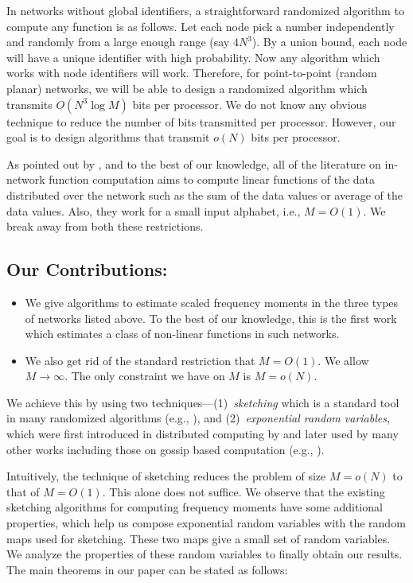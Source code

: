 \documentclass[10pt,twosided,a4paper,draft,onecolumn]{article}
\begin{document}
In networks without global identifiers, a straightforward randomized
algorithm to compute any function is as follows. Let each node pick a
number independently and randomly from a large enough range (say
$4N^3$). By a union bound, each node will have a unique identifier
with high probability. Now any algorithm which works with node
identifiers will work. Therefore, for point-to-point (random planar)
networks, we will be able to design a randomized algorithm which
transmits $O(N^3 \log M)$ bits per processor. We do not know any obvious
technique to reduce the number of bits transmitted per
processor. However, our goal is to design algorithms that transmit $o(N)$ bits per processor. 

As pointed out by \cite{Giridhar06}, and to the best of our knowledge,
all of the literature on in-network function computation aims to
compute linear functions of the data distributed over the network such as the
sum of the data values or average of the data values. Also, they work
for a small input alphabet, i.e., $M=O(1)$. We break away from both
these restrictions.

\subsection*{Our Contributions:}
\begin{itemize}
\item We give algorithms to estimate scaled frequency moments in the
  three types of networks listed above. To the best of our knowledge,
  this is the first work which estimates a class of non-linear functions in such
  networks.

\item We also get rid of the standard restriction that $M=O(1)$. We
  allow $M \rightarrow \infty$. The only constraint we have on $M$ is
  $M=o(N)$.
\end{itemize}
We achieve this by using two
techniques---(1)~\emph{sketching} which is a standard tool in many
randomized algorithms (e.g., \cite{Muthukrishnan05,Motwani96}), and
(2)~\emph{exponential random variables}, which were first introduced
in distributed computing by \cite{Cohen97} and later used by many
other works including those on gossip based computation (e.g.,
\cite{Mosk-Aoyama06}).

Intuitively, the technique of sketching reduces the problem of size
$M=o(N)$ to that of $M=O(1)$. This alone does not suffice. We observe
that the existing sketching algorithms for computing frequency moments
have some additional properties, which help us compose exponential
random variables with the random maps used for sketching. These two
maps give a small set of random variables. We analyze the properties
of these random variables to finally obtain our results.  The main
theorems in our paper can be stated as follows:
\end{document}
